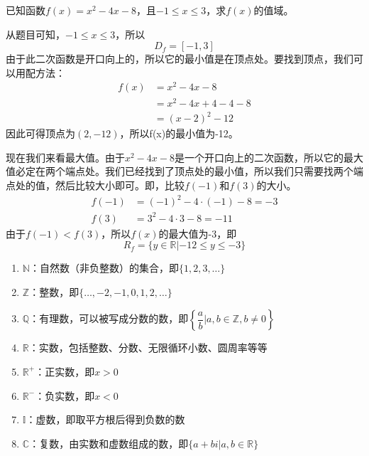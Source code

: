 \documentclass[UTF8]{ctexart}
\begin{document}
\newpage
\begin{question}[（已知定义域的一元二次函数）]
    已知函数$f(x) = x^2 - 4x - 8$，且$-1 \leq x \leq 3$，求$f(x)$的值域。
\end{question}

\begin{solution}
    从题目可知，$-1 \leq x \leq 3$，所以
    \[
        D_f = [-1, 3]
    \]
    由于此二次函数是开口向上的，所以它的最小值是在顶点处。要找到顶点，我们可以用配方法：
\begin{align*}
    f(x) &= x^2 - 4x - 8\\
    &= x^2 - 4x + 4 - 4 - 8\\
    &= (x - 2)^2 - 12
\end{align*}
因此可得顶点为$(2, -12)$，所以f(x)的最小值为-12。

现在我们来看最大值。由于$x^2 - 4x - 8$是一个开口向上的二次函数，所以它的最大值必定在两个端点处。我们已经找到了顶点处的最小值，所以我们只需要找两个端点处的值，然后比较大小即可。即，比较$f(-1)$和$f(3)$的大小。
\begin{align*}
    f(-1) &= (-1)^2 - 4 \cdot (-1) - 8= -3\\
    f(3) &= 3^2 - 4 \cdot 3 - 8 = -11
\end{align*}
由于$f(-1) < f(3)$，所以$f(x)$的最大值为-3，即
\[
    R_f = \{y \in \mathbb{R} | -12 \leq y \leq -3\}
\]
\end{solution}

\begin{info}[常用集合符号]
    \begin{enumerate}
        \item $\mathbb{N}$：自然数（非负整数）的集合，即$\{1, 2, 3, \ldots\}$
        \item   $\mathbb{Z}$：整数，即$\{\ldots, -2, -1, 0, 1, 2, \ldots\}$
        \item  $\mathbb{Q}$：有理数，可以被写成分数的数，即$\left\{\dfrac{a}{b} | a, b \in \mathbb{Z}, b \neq 0\right\}$
        \item $\mathbb{R}$：实数，包括整数、分数、无限循环小数、圆周率等等
        \item $\mathbb{R}^+$：正实数，即$x > 0$
        \item $\mathbb{R}^-$：负实数，即$x < 0$
        \item $\mathbb{I}$：虚数，即取平方根后得到负数的数
        \item $\mathbb{C}$：复数，由实数和虚数组成的数，即$\{a + bi | a, b \in \mathbb{R}\}$
    \end{enumerate}
\end{info}
\end{document}
